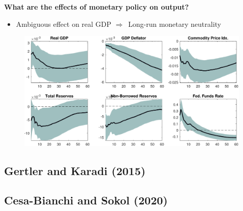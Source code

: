 \begin{frame}
{\textbf{What are the effects of monetary policy on output?}}

\begin{itemize}
\item Ambiguous effect on real GDP $\Longrightarrow $\ Long-run monetary
neutrality
\end{itemize}

\begin{figure}[h]
\vspace{.3cm}\includegraphics[width=.8\textwidth]{Uhlig_Replication.pdf}
\end{figure}
\end{frame}


\subsection{Gertler and Karadi (2015)}

\begin{frame}
\vspace{3cm} \color{title}%
\bigskip

\color{note}
\end{frame}


\subsection{Cesa-Bianchi and Sokol (2020)}

\begin{frame}
\vspace{3cm} \color{title}%
\bigskip

\color{note}
\end{frame}



